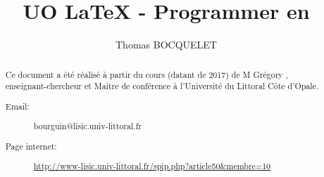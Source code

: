 \documentclass[french]{report}
\title{UO \LaTeX{} - Programmer en \lang{}}
\author{Thomas BOCQUELET}
\date{
	\today{}
	\begin{center}
		\texttt{[image: images/logoulco]}
	\end{center}
}
\begin{document}
	\maketitle
	
	\begin{abstract}
		Ce document a été réalisé à partir du cours (datant de 2017) de M Grégory , enseignant-chercheur et Maître de conférence à l'Université du Littoral Côte d'Opale.
		
		\begin{description}
			\item[Email:] bourguin@lisic.univ-littoral.fr
			\item[Page internet:] \url{http://www-lisic.univ-littoral.fr/spip.php?article50\&membre=10}
		\end{description}
		
	\end{abstract}
	
	\tableofcontents
	\listoffigures
	\listoftables
	
	
	

	
	
	
	
	
	\appendix
	
	

	
\end{document}
